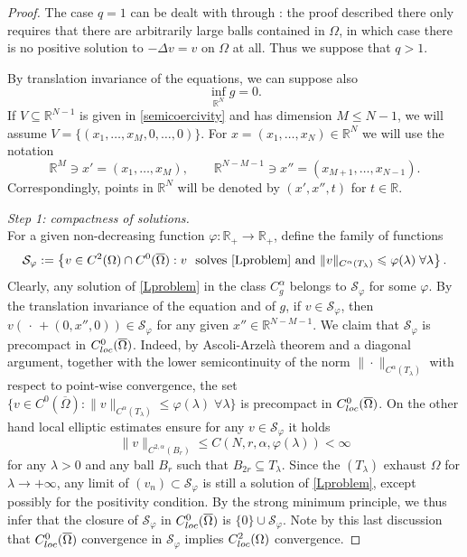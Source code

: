 \documentclass[12pt]{amsart}
\numberwithin{equation}{section}
\theoremstyle{plain}
\theoremstyle{plain}
\theoremstyle{plain}
\theoremstyle{definition}
\newcommand{\R}{{\mathbb R}}
\renewcommand{\le}{\leqslant}
\newcommand{\cal}{\mathcal}
\begin{document}
\begin{proof}
The case $q=1$ can be dealt with through \cite[Remark 8.11]{QuSo19}: the proof described there only requires that there are arbitrarily large balls contained in $\Omega$, in which case there is no positive solution to $-\Delta v=v$ on $\Omega$ at all. 
Thus we suppose that $q>1$. 

By translation invariance of the equations, we can suppose also
 \[
\inf_{\R^{N}} g=0.
\]
If $V\subseteq\R^{N-1}$ is given in \eqref{semicoercivity} and has dimension $M\le N-1$, we will assume $V=\{(x_1, \dots, x_M, 0, \dots, 0)\}$. For $x=(x_1, \dots, x_N)\in \R^N$ we will use the notation 
\[
\R^M\ni x'=(x_1, \dots, x_{M}),\qquad \R^{N-M-1}\ni x''=(x_{M+1}, \dots, x_{N-1}).
\]
 Correspondingly, points in $\R^{N}$ will be denoted by $(x', x'', t)$ for $t\in \R$.

\smallskip
{\em Step 1: compactness of solutions.}\\
For a given non-decreasing function $\varphi:\R_+\to \R_+$, define the family of functions
\[
{\cal S}_{\varphi}:=\left\{ v\in C^2(\Omega)\cap C^0(\overline{\Omega}): v \ \text{ solves \eqref{Lproblem} and } \|v\|_{C^\alpha(T_\lambda)}\le \varphi(\lambda) \; \forall \lambda\right\}.
\]
Clearly, any solution of \eqref{Lproblem} in the class $C^\alpha_g$ belongs to ${\cal S}_{\varphi}$ for some $\varphi$.
By the translation invariance of the equation and of $g$, if $v\in {\cal S}_{\varphi}$, then $v(\,\cdot\, + (0, x'', 0))\in {\cal S}_{\varphi}$ for any given $x''\in \R^{N-M-1}$. 
We claim that ${\cal S}_{\varphi}$ is precompact in $C^0_{\rm loc}(\overline{\Omega})$. 
Indeed, by Ascoli-Arzelà theorem and a diagonal argument, together with the lower semicontinuity of the norm $\| \cdot \|_{C^\alpha(T_\lambda)}$ with respect to point-wise convergence, the set $\{v\in C^0(\overline{\Omega}): \|v\|_{C^\alpha(T_\lambda)}\le \varphi(\lambda) \; \forall \lambda\}$ is precompact in $C^0_{\rm loc}(\overline{\Omega})$. 
On the other hand local elliptic estimates ensure for any $v\in {\cal S}_{\varphi}$ it holds
\[
\|v\|_{C^{2, \alpha}(B_r)}\le C(N, r, \alpha, \varphi (\lambda))<\infty
\]
for any $\lambda >0$ and any ball $B_r$ such that $B_{2r}\subseteq T_\lambda$. 
Since the $(T_\lambda)$ exhaust $\Omega$ for $\lambda\to +\infty$, any limit of $(v_n)\subset {\cal S}_{\varphi}$ is still a solution of \eqref{Lproblem}, except possibly for the positivity condition. 
By the strong minimum principle, we thus infer that the closure of ${\cal S}_{\varphi}$ in $C^0_{\rm loc}(\overline{\Omega})$ is $\{0\}\cup {\cal S}_{\varphi}$. 
Note by this last discussion that $C^0_{\rm loc}(\overline{\Omega})$ convergence in ${\cal S}_{\varphi}$ implies $C^2_{\rm loc}(\Omega)$ convergence.


\end{proof}
\end{document}
